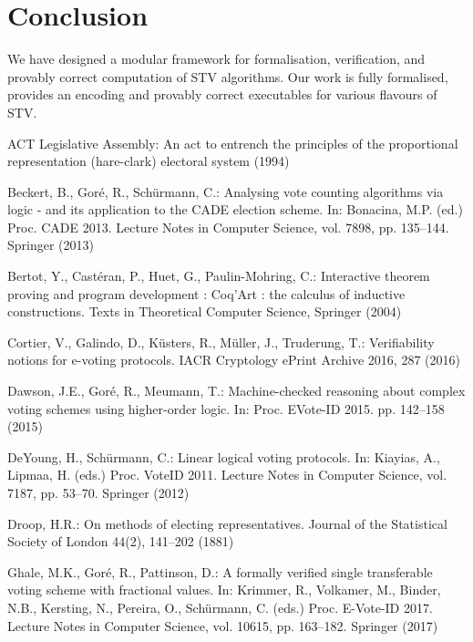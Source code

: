 \documentclass{llncs}
\begin{document}
\section{Conclusion}
We have designed a modular framework for formalisation, verification, 
and provably correct computation of STV algorithms. Our work
is fully formalised, provides an encoding and provably correct
executables for various flavours of STV. 

%
\begin{thebibliography}{10}
\providecommand{\url}[1]{\texttt{#1}}
\providecommand{\urlprefix}{URL }

{ACT Legislative Assembly}: An act to entrench the principles of the
  proportional representation (hare-clark) electoral system (1994)

Beckert, B., Gor{\'{e}}, R., Sch{\"{u}}rmann, C.: Analysing vote counting
  algorithms via logic - and its application to the {CADE} election scheme. In:
  Bonacina, M.P. (ed.) Proc. CADE 2013. Lecture Notes in Computer Science, vol.
  7898, pp. 135--144. Springer (2013)

Bertot, Y., Cast{\'e}ran, P., Huet, G., Paulin-Mohring, C.: Interactive theorem
  proving and program development : Coq'Art : the calculus of inductive
  constructions. Texts in Theoretical Computer Science, Springer (2004)

Cortier, V., Galindo, D., K{\"{u}}sters, R., M{\"{u}}ller, J., Truderung, T.:
  Verifiability notions for e-voting protocols. {IACR} Cryptology ePrint
  Archive  2016,  287 (2016)

Dawson, J.E., Gor{\'{e}}, R., Meumann, T.: Machine-checked reasoning about
  complex voting schemes using higher-order logic. In: Proc. EVote-ID 2015. pp.
  142--158 (2015)

DeYoung, H., Sch{\"{u}}rmann, C.: Linear logical voting protocols. In: Kiayias,
  A., Lipmaa, H. (eds.) Proc. VoteID 2011. Lecture Notes in Computer Science,
  vol. 7187, pp. 53--70. Springer (2012)

Droop, H.R.: On methods of electing representatives. Journal of the Statistical
  Society of London  44(2),  141--202 (1881)

Ghale, M.K., Gor{\'{e}}, R., Pattinson, D.: A formally verified single
  transferable voting scheme with fractional values. In: Krimmer, R., Volkamer,
  M., Binder, N.B., Kersting, N., Pereira, O., Sch{\"{u}}rmann, C. (eds.) Proc.
  E-Vote-ID 2017. Lecture Notes in Computer Science, vol. 10615, pp. 163--182.
  Springer (2017)


\end{thebibliography}
\end{document}
